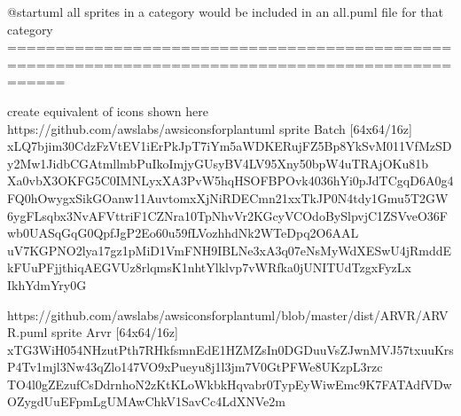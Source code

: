 \documentclass[letterpaper,10pt,english]{sphinxmanual}
\begin{document}
\begin{figure}[htbp]
\centering
\capstart

\caption{}\label{\detokenize{Stdlib/StandardisingStdLib:id5}}\end{figure}

%
\begin{sphinxVerbatim}[commandchars=\\\{\},numbers=left,firstnumber=1,stepnumber=1]
@startuml
\PYGZsq{}all sprites in a category would be included in an all.puml file for that category
\PYGZsq{}==================================================================================================

\PYGZsq{}create equivalent of icons shown here https://github.com/awslabs/aws\PYGZhy{}icons\PYGZhy{}for\PYGZhy{}plantuml
sprite \PYGZdl{}Batch [64x64/16z] \PYGZob{}
xLQ7bjim30CdzFzVtEV1iErPkJpT7iYm5aWDKERujFZ5Bp8YkSvM011VfMzSDy2Mw1JidbCGAtmllmbPuIkoImjyGUsyBV4LV95\PYGZus{}Xny50bpW4uTRAjOKu81b
Xa0vbX3OKFG5C0IMNLyxXA\PYGZus{}3PvW5hqHSOFBP\PYGZus{}Ovk4036hYi0pJdTCgqD6A0g4FQ0hOwygxSikGOanw11AuvtomxXjNiRDECmn21xxTkJP0N4tdy1Gmu5T2GW
6ygFL\PYGZus{}sqbx3NvA\PYGZus{}FVtt\PYGZus{}ri\PYGZus{}F1CZNra\PYGZhy{}10TpNhvVr2KGcyVCOdoBySlpv\PYGZhy{}jC1ZSVveO36\PYGZus{}Fwb0UASqGqG0QpfJgP2Eo60u59\PYGZhy{}fLVozhhdNk2WTeDpq2O6AAL\PYGZus{}
uV7KGPNO2lya17gz1pMiD1VmFNH9IBLNe3xA3q07eNsMy\PYGZus{}WdXESwU4jRmddEk\PYGZhy{}FUuPFjjthiqAEGVUz8rlqmsK1nhtYlklvp7vWRfka0jUNITUdTzgxFyzLx
\PYGZhy{}Ikh\PYGZus{}YdmYr\PYGZus{}y0G
\PYGZcb{}

\PYGZsq{}https://github.com/awslabs/aws\PYGZhy{}icons\PYGZhy{}for\PYGZhy{}plantuml/blob/master/dist/ARVR/ARVR.puml
sprite \PYGZdl{}Arvr [64x64/16z] \PYGZob{}
xTG3WiH054NHzutP\PYGZus{}th7RHkfsmnEdE1HZMZsIn0\PYGZus{}DGDuuVsZJwnMVJ\PYGZhy{}57txuuKrsP4Tv1mjl3Nw43qZlo147VO9xPueyu8j1l3jm7V0GtPFWe8\PYGZus{}UKzpL3rzc
TO4l0gZEzufCsDd\PYGZhy{}rnhoN2zKtKLoWk\PYGZhy{}bkHq\PYGZhy{}\PYGZhy{}vabr0TypEy\PYGZus{}WiwEmc9K7FATAd\PYGZus{}fVDwOZygdU\PYGZus{}uEF\PYGZus{}pmLgUMA\PYGZus{}wChkV1SavCc4LdXNVe2m
\PYGZcb{}


\end{sphinxVerbatim}
\end{document}
